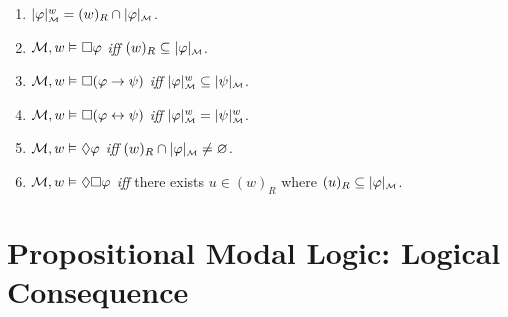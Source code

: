 \documentclass[a4paper, 11pt]{article} %
\begin{document}
\begin{enumerate}[leftmargin=1.2in,itemsep=1pt]
    \item $\interpret{\M}{\metaA}^w = (w)_R \cap \interpret{\M}{\metaA}$.
    \item $\M, w \MLmodels[] \Box\metaA$ \textit{iff} $(w)_R \subseteq \interpret{\M}{\metaA}$.
    \item $\M, w \MLmodels[] \Box(\metaA \rightarrow \metaB)$ \textit{iff} $\interpret{\M}{\metaA}^w \subseteq \interpret{\M}{\metaB}$.
    \item $\M, w \MLmodels[] \Box(\metaA \leftrightarrow \metaB)$ \textit{iff} $\interpret{\M}{\metaA}^w = \interpret{\M}{\metaB}^w$.
    \item $\M, w \MLmodels[] \Diamond\metaA$ \textit{iff} $(w)_R \cap \interpret{\M}{\metaA} \neq \varnothing$.
    \item $\M, w \MLmodels[] \Diamond\Box\metaA$ \textit{iff} there exists $u \in (w)_R$ where $(u)_R \subseteq \interpret{\M}{\metaA}$.
\end{enumerate}





\section*{\sc Propositional Modal Logic: Logical Consequence}
\end{document}
